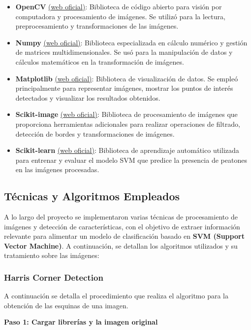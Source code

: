 \documentclass[a4paper]{article}
\begin{document}
\begin{itemize}
\item \textbf{OpenCV} \href{https://opencv.org/}{(web oficial)}: Biblioteca de código abierto para visión por computadora y procesamiento de imágenes. Se utilizó para la lectura, preprocesamiento y transformaciones de las imágenes.
\item \textbf{Numpy} \href{https://numpy.org/}{(web oficial)}: Biblioteca especializada en cálculo numérico y gestión de matrices multidimensionales. Se usó para la manipulación de datos y cálculos matemáticos en la transformación de imágenes.
\item \textbf{Matplotlib} \href{https://matplotlib.org/}{(web oficial)}: Biblioteca de visualización de datos. Se empleó principalmente para representar imágenes, mostrar los puntos de interés detectados y visualizar los resultados obtenidos.
\item \textbf{Scikit-image} \href{https://scikit-image.org/}{(web oficial)}: Biblioteca de procesamiento de imágenes que proporciona herramientas adicionales para realizar operaciones de filtrado, detección de bordes y transformaciones de imágenes.
\item \textbf{Scikit-learn} \href{https://scikit-learn.org/}{(web oficial)}: Biblioteca de aprendizaje automático utilizada para entrenar y evaluar el modelo SVM que predice la presencia de peatones en las imágenes procesadas.
\end{itemize}

\subsection{Técnicas y Algoritmos Empleados}

A lo largo del proyecto se implementaron varias técnicas de procesamiento de imágenes y detección de características, con el objetivo de extraer información relevante para alimentar un modelo de clasificación basado en \textbf{SVM (Support Vector Machine)}. A continuación, se detallan los algoritmos utilizados y su tratamiento sobre las imágenes:

\subsubsection{Harris Corner Detection}

A continuación se detalla el procedimiento que realiza el algoritmo para la obtención de las esquinas de una imagen.
\par\vspace{0.5cm}
\textbf{Paso 1: Cargar librerías y la imagen original}
\par\vspace{0.5cm}
\end{document}
